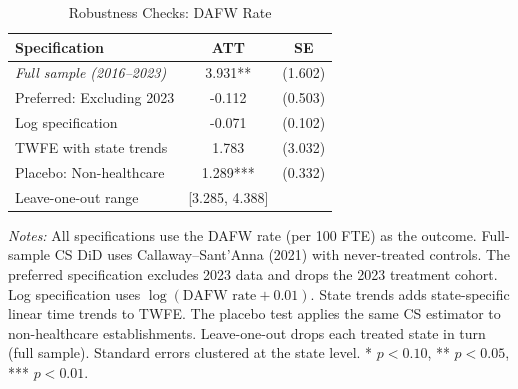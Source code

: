 \begin{table}[htbp]
\centering
\caption{Robustness Checks: DAFW Rate}
\label{tab:robustness}
\begin{tabular}{lcc}
\toprule
Specification & ATT & SE \\
\midrule
\textit{Full sample (2016--2023)} & 3.931** & (1.602) \\
\addlinespace
Preferred: Excluding 2023 & -0.112 & (0.503) \\
Log specification & -0.071 & (0.102) \\
TWFE with state trends & 1.783 & (3.032) \\
Placebo: Non-healthcare & 1.289*** & (0.332) \\
\addlinespace
Leave-one-out range & [3.285, 4.388] & \\
\bottomrule
\end{tabular}
\begin{tablenotes}[flushleft]
\small
\item \textit{Notes:} All specifications use the DAFW rate (per 100 FTE) as the outcome. Full-sample CS DiD uses Callaway--Sant'Anna (2021) with never-treated controls. The preferred specification excludes 2023 data and drops the 2023 treatment cohort. Log specification uses $\log(\text{DAFW rate} + 0.01)$. State trends adds state-specific linear time trends to TWFE. The placebo test applies the same CS estimator to non-healthcare establishments. Leave-one-out drops each treated state in turn (full sample). Standard errors clustered at the state level. * $p<0.10$, ** $p<0.05$, *** $p<0.01$.
\end{tablenotes}
\end{table}
